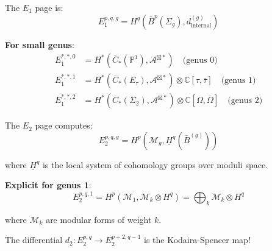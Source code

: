 \begin{theorem}
\label{thm:e1-page-complete}
The $E_1$ page is:
\begin{equation}
E_1^{p,q,g} = H^q\left(\bar{B}^p(\Sigma_g), d^{(g)}_{\text{internal}}\right)
\end{equation}

\textbf{For small genus}:
\begin{align}
E_1^{*,*,0} &= H^*(\overline{C}_*(\mathbb{P}^1), \mathcal{A}^{\boxtimes *}) \quad \text{(genus 0)} \\
E_1^{*,*,1} &= H^*(\overline{C}_*(E_\tau), \mathcal{A}^{\boxtimes *}) \otimes \mathbb{C}[\tau, \bar{\tau}] \quad \text{(genus 1)} \\
E_1^{*,*,2} &= H^*(\overline{C}_*(\Sigma_2), \mathcal{A}^{\boxtimes *}) \otimes \mathbb{C}[\Omega, \bar{\Omega}] \quad \text{(genus 2)}
\end{align}
\end{theorem}

\begin{theorem}
\label{thm:e2-page-complete}
The $E_2$ page computes:
\begin{equation}
E_2^{p,q,g} = H^p\left(\mathcal{M}_g, \underline{H}^q(\bar{B}^{(g)})\right)
\end{equation}

where $\underline{H}^q$ is the local system of cohomology groups over moduli space.

\textbf{Explicit for genus 1}:
\begin{equation}
E_2^{p,q,1} = H^p(\mathcal{M}_1, \mathcal{M}_k \otimes H^q) = \bigoplus_{k} \mathcal{M}_k \otimes H^{q}
\end{equation}

where $\mathcal{M}_k$ are modular forms of weight $k$.

The differential $d_2: E_2^{p,q} \to E_2^{p+2,q-1}$ is the Kodaira-Spencer map!
\end{theorem}

